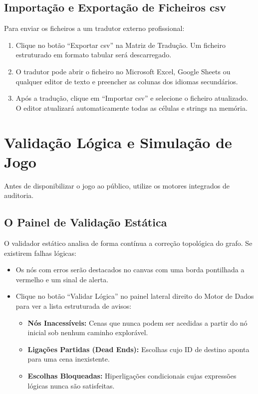 \subsection{Importação e Exportação de Ficheiros \gls{csv}}
Para enviar os ficheiros a um tradutor externo profissional:
\begin{enumerate}
    \item Clique no botão ``Exportar \gls{csv}'' na Matriz de Tradução. Um ficheiro estruturado em formato tabular será descarregado.
    \item O tradutor pode abrir o ficheiro no Microsoft Excel, Google Sheets ou qualquer editor de texto e preencher as colunas dos idiomas secundários.
    \item Após a tradução, clique em ``Importar \gls{csv}'' e selecione o ficheiro atualizado. O editor atualizará automaticamente todas as células e strings na memória.
\end{enumerate}

\section{Validação Lógica e Simulação de Jogo}
Antes de disponibilizar o jogo ao público, utilize os motores integrados de auditoria.

\subsection{O Painel de Validação Estática}
O validador estático analisa de forma contínua a correção topológica do grafo. Se existirem falhas lógicas:
\begin{itemize}
    \item Os nós com erros serão destacados no canvas com uma borda pontilhada a vermelho e um sinal de alerta.
    \item Clique no botão ``Validar Lógica'' no painel lateral direito do Motor de Dados para ver a lista estruturada de avisos:
    \begin{itemize}
        \item \textbf{Nós Inacessíveis:} Cenas que nunca podem ser acedidas a partir do nó inicial sob nenhum caminho explorável.
        \item \textbf{Ligações Partidas (Dead Ends):} Escolhas cujo ID de destino aponta para uma cena inexistente.
        \item \textbf{Escolhas Bloqueadas:} Hiperligações condicionais cujas expressões lógicas nunca são satisfeitas.
    \end{itemize}
\end{itemize}

